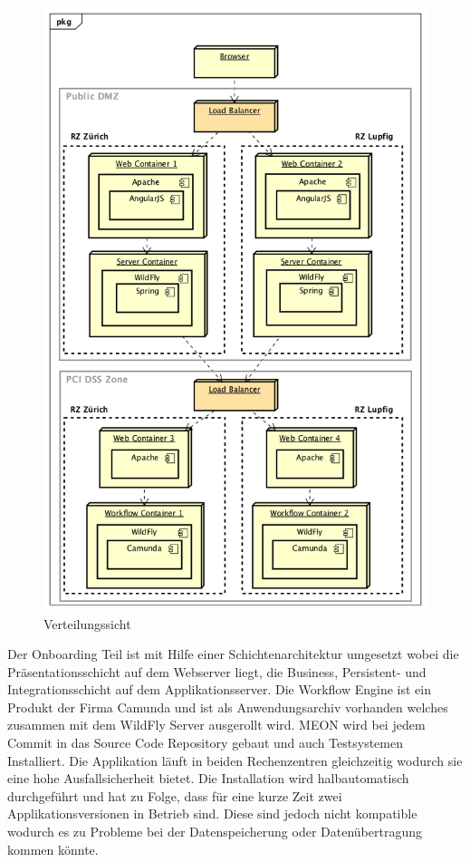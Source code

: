 \begin{figure}[H]
	\centering
	\includegraphics[scale=0.6]{CurrentDeployment.png}
	\caption{Verteilungssicht}
\end{figure}
\newpage \noindent 
Der Onboarding Teil ist mit Hilfe einer Schichtenarchitektur umgesetzt wobei die Präsentationsschicht auf dem Webserver liegt, die Business, Persistent- und Integrationsschicht auf dem Applikationsserver. Die Workflow Engine ist ein Produkt der Firma Camunda und ist als Anwendungsarchiv vorhanden welches zusammen mit dem WildFly Server ausgerollt wird. MEON wird bei jedem Commit in das Source Code Repository gebaut und auch Testsystemen Installiert.\newline
Die Applikation läuft in beiden Rechenzentren gleichzeitig wodurch sie eine hohe Ausfallsicherheit bietet. Die Installation wird halbautomatisch durchgeführt und hat zu Folge, dass für eine kurze Zeit zwei Applikationsversionen in Betrieb sind. Diese sind jedoch nicht kompatible wodurch es zu Probleme bei der Datenspeicherung oder Datenübertragung kommen könnte.

